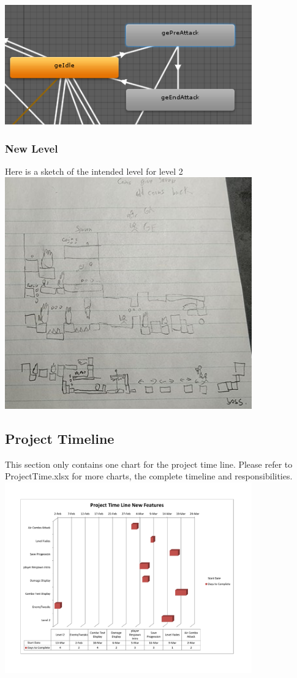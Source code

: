 \documentclass{article}
\begin{document}
\includegraphics[width=0.8\textwidth]{preAnimation.png}

\subsubsection*{New Level}

Here is a sketch of the intended level for level 2 \\
\includegraphics[width=0.8\textwidth]{level2.png} \\

\subsection*{Project Timeline}
This section only contains one chart for the project time line. Please refer to ProjectTime.xlsx for more charts, the complete timeline and responsibilities. \\
\includegraphics[width=0.8\textwidth]{ProjectTime.pdf} \\
\end{document}
